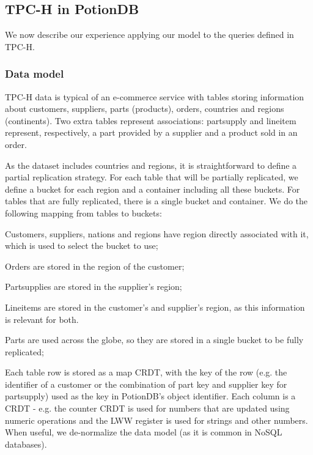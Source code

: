 \documentclass[sigplan,twocolumn,review,anonymous]{acmart}
\begin{document}
\subsection{TPC-H in PotionDB}

We now describe our experience applying our 
model to the queries defined in TPC-H.

\subsubsection{Data model}
\label{subsec:dataset}

TPC-H data is typical of an e-commerce service with tables storing information about customers, suppliers, parts (products), orders, 
countries and regions (continents).
Two extra tables represent associations: partsupply and lineitem represent, respectively, a part provided by a supplier
and a product sold in an order. 

As the dataset includes countries and regions, it is straightforward to define a partial replication strategy. 
For each table that will be partially replicated, we define a bucket for each region and a container including all these buckets.
For tables that are fully replicated, there is a single bucket and container. 
We do the following mapping from tables to buckets: 
\begin{inparaenum}[(i)]
\item Customers, suppliers, nations and regions have 
region directly
associated with it, which is used to select the bucket to use;
\item Orders are stored in the region of the customer;
\item Partsupplies are stored in the supplier's region;
\item Lineitems are stored in the customer's and supplier's region, as this information is relevant for both.
\item Parts are used across the globe, so they are stored in a single bucket to be fully replicated;
\end{inparaenum}

Each table row is stored as a map CRDT, with the key of the row (e.g. the identifier of a customer or the combination of part key and supplier key for partsupply) used as the key in PotionDB's object identifier. 
Each column is a CRDT - e.g. the counter CRDT is used for numbers that are updated using numeric operations and the
LWW register is used for strings and other numbers.
When useful, we de-normalize the data model (as it is common in NoSQL databases). 
\end{document}
